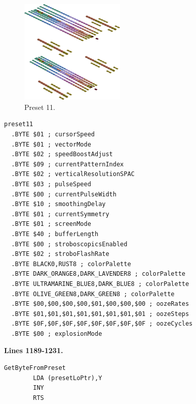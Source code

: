 \vspace*{-0.5cm}
\begin{minipage}[b]{0.48\linewidth}
\begin{figure}[H]                                                          
  \centering                                                             
  \begin{adjustbox}{width=5cm,center}                                   
  \includegraphics[width=5cm]{src/colorspace_presets/preset11-45.png}%
  \end{adjustbox}                                                        
\caption*{Preset 11.}                                           
\end{figure}                                                               
\end{minipage}
\hspace{0.1cm}
\begin{minipage}[b]{0.48\linewidth}                                                                         
\begin{lstlisting}[basicstyle=\ttfamily\tiny]
preset11
  .BYTE $01 ; cursorSpeed
  .BYTE $01 ; vectorMode
  .BYTE $02 ; speedBoostAdjust
  .BYTE $09 ; currentPatternIndex
  .BYTE $02 ; verticalResolutionSPAC
  .BYTE $03 ; pulseSpeed
  .BYTE $00 ; currentPulseWidth
  .BYTE $10 ; smoothingDelay
  .BYTE $01 ; currentSymmetry
  .BYTE $01 ; screenMode
  .BYTE $40 ; bufferLength
  .BYTE $00 ; stroboscopicsEnabled
  .BYTE $02 ; stroboFlashRate
  .BYTE BLACK0,RUST8 ; colorPalette
  .BYTE DARK_ORANGE8,DARK_LAVENDER8 ; colorPalette
  .BYTE ULTRAMARINE_BLUE8,DARK_BLUE8 ; colorPalette
  .BYTE OLIVE_GREEN8,DARK_GREEN8 ; colorPalette
  .BYTE $00,$00,$00,$00,$01,$00,$00,$00 ; oozeRates
  .BYTE $01,$01,$01,$01,$01,$01,$01,$01 ; oozeSteps
  .BYTE $0F,$0F,$0F,$0F,$0F,$0F,$0F,$0F ; oozeCycles
  .BYTE $00 ; explosionMode
\end{lstlisting}
\end{minipage}
\clearpage
\textbf{Lines 1189-1231. } 
\begin{lstlisting}
GetByteFromPreset
        LDA (presetLoPtr),Y
        INY 
        RTS 
\end{lstlisting}

